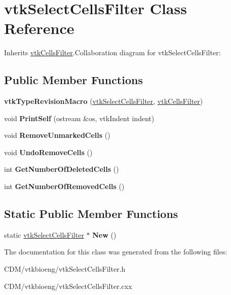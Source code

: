 \hypertarget{classvtkSelectCellsFilter}{
\section{vtkSelectCellsFilter Class Reference}
\label{classvtkSelectCellsFilter}
}


Inherits \hyperlink{classvtkCellsFilter}{vtkCellsFilter}.Collaboration diagram for vtkSelectCellsFilter:\subsection*{Public Member Functions}
\begin{DoxyCompactItemize}
\item 
\hypertarget{classvtkSelectCellsFilter_a97afe8b94d0df57041a2ea955f5319d6}{
{\bfseries vtkTypeRevisionMacro} (\hyperlink{classvtkSelectCellsFilter}{vtkSelectCellsFilter}, \hyperlink{classvtkCellsFilter}{vtkCellsFilter})}
\label{classvtkSelectCellsFilter_a97afe8b94d0df57041a2ea955f5319d6}

\item 
\hypertarget{classvtkSelectCellsFilter_ab4dbfd9bd0ed3055e62096c9e70641e1}{
void {\bfseries PrintSelf} (ostream \&os, vtkIndent indent)}
\label{classvtkSelectCellsFilter_ab4dbfd9bd0ed3055e62096c9e70641e1}

\item 
\hypertarget{classvtkSelectCellsFilter_a6313ab4ca06976e9b704926477a5388a}{
void {\bfseries RemoveUnmarkedCells} ()}
\label{classvtkSelectCellsFilter_a6313ab4ca06976e9b704926477a5388a}

\item 
\hypertarget{classvtkSelectCellsFilter_aefabe7d7f0123f9a2f1cbdbc84e5fbb9}{
void {\bfseries UndoRemoveCells} ()}
\label{classvtkSelectCellsFilter_aefabe7d7f0123f9a2f1cbdbc84e5fbb9}

\item 
\hypertarget{classvtkSelectCellsFilter_af9a6cbce42557edea5fe202ea80e3a4c}{
int {\bfseries GetNumberOfDeletedCells} ()}
\label{classvtkSelectCellsFilter_af9a6cbce42557edea5fe202ea80e3a4c}

\item 
\hypertarget{classvtkSelectCellsFilter_ab5e77d61c73860f82968b9e361912895}{
int {\bfseries GetNumberOfRemovedCells} ()}
\label{classvtkSelectCellsFilter_ab5e77d61c73860f82968b9e361912895}

\end{DoxyCompactItemize}
\subsection*{Static Public Member Functions}
\begin{DoxyCompactItemize}
\item 
\hypertarget{classvtkSelectCellsFilter_af20036c6f49bd1a87adf1f713fae1d4e}{
static \hyperlink{classvtkSelectCellsFilter}{vtkSelectCellsFilter} $\ast$ {\bfseries New} ()}
\label{classvtkSelectCellsFilter_af20036c6f49bd1a87adf1f713fae1d4e}

\end{DoxyCompactItemize}


The documentation for this class was generated from the following files:\begin{DoxyCompactItemize}
\item 
CDM/vtkbioeng/vtkSelectCellsFilter.h\item 
CDM/vtkbioeng/vtkSelectCellsFilter.cxx\end{DoxyCompactItemize}
